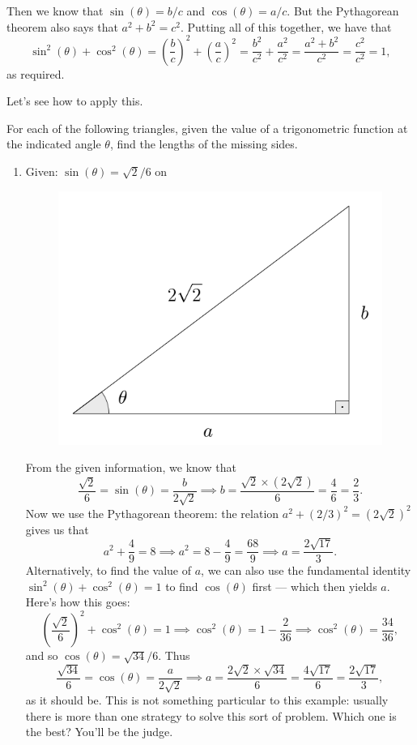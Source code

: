\documentclass{ximera}
\begin{document}
Then we know that $\sin(\theta) = b/c$ and $\cos(\theta) = a/c$. But the Pythagorean theorem also says that $a^2+b^2=c^2$. Putting all of this together, we have that $$\sin^2(\theta) + \cos^2(\theta) = \left(\frac{b}{c}\right)^2 + \left(\frac{a}{c}\right)^2 = \frac{b^2}{c^2}+\frac{a^2}{c^2} = \frac{a^2+b^2}{c^2} = \frac{c^2}{c^2} = 1,$$as required.

Let's see how to apply this.

\begin{example}For each of the following triangles, given the value of a trigonometric function at the indicated angle $\theta$, find the lengths of the missing sides.
  \begin{enumerate}[label=\alph*.]
  \item Given: $\sin(\theta) = \sqrt{2}/6$ on

    \begin{figure}[h]
      \centering
      \includegraphics[scale=.3]{./figures/9-1-1-triangle-sin-2sqrt2-6.png}
    \end{figure}

    \begin{explanation}
 From the given information, we know that $$\frac{\sqrt{2}}{6} = \sin(\theta) = \frac{b}{2\sqrt{2}} \implies b = \frac{\sqrt{2}\times (2\sqrt{2})}{6} = \frac{4}{6} = \frac{2}{3}.$$Now we use the Pythagorean theorem: the relation $a^2 +(2/3)^2=(2\sqrt{2})^2$ gives us that $$a^2+\frac{4}{9} = 8 \implies a^2 = 8-\frac{4}{9} = \frac{68}{9} \implies a = \frac{2\sqrt{17}}{3}.$$Alternatively, to find the value of $a$, we can also use the fundamental identity $\sin^2(\theta)+\cos^2(\theta)=1$ to find $\cos(\theta)$ first --- which then yields $a$. Here's how this goes: $$ \left(\frac{\sqrt{2}}{6}\right)^2+\cos^2(\theta)=1 \implies \cos^2(\theta) = 1- \frac{2}{36} \implies \cos^2(\theta) = \frac{34}{36},$$and so $\cos(\theta) = \sqrt{34}/6$. Thus $$\frac{\sqrt{34}}{6} = \cos(\theta) = \frac{a}{2\sqrt{2}} \implies a = \frac{2\sqrt{2} \times \sqrt{34}}{6} = \frac{4\sqrt{17}}{6} = \frac{2\sqrt{17}}{3},$$as it should be. This is not something particular to this example: usually there is more than one strategy to solve this sort of problem. Which one is the best? You'll be the judge.
    \end{explanation}
    

\end{enumerate}
\end{example}
\end{document}
